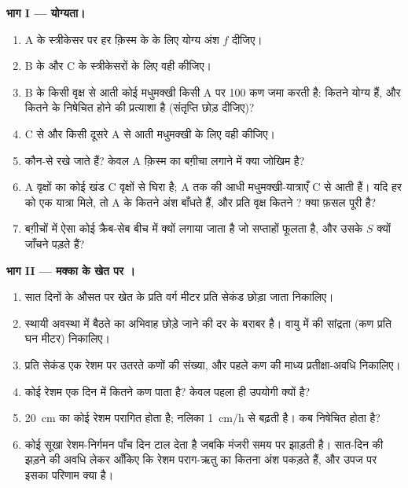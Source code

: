 \begin{problem}
\medskip
\noindent\textbf{भाग I --- योग्यता।}
\begin{enumerate}
  \item A के स्त्रीकेसर पर हर क़िस्म के  के लिए योग्य अंश
        $f$ दीजिए।
  \item B के और C के स्त्रीकेसरों के लिए वही कीजिए।
  \item B के किसी वृक्ष से आती कोई मधुमक्खी किसी A  पर 100
        कण जमा करती है: कितने योग्य हैं, और कितने  के
        निषेचित होने की प्रत्याशा है (संतृप्ति छोड़ दीजिए)?
  \item C से और किसी दूसरे A से आती मधुमक्खी के लिए वही कीजिए।
  \item कौन-से  रखे जाते हैं? केवल A क़िस्म का बग़ीचा लगाने में क्या
        जोखिम है?
  \item A वृक्षों का कोई खंड C वृक्षों से घिरा है; A तक की आधी
        मधुमक्खी-यात्राएँ C से आती हैं। यदि हर  को एक यात्रा मिले,
        तो A के कितने अंश   बाँधते हैं, और प्रति वृक्ष कितने ?
        क्या फ़सल पूरी है?
  \item बग़ीचों में ऐसा कोई क्रैब-सेब बीच में क्यों लगाया जाता है जो
        सप्ताहों फूलता है, और उसके $S$  क्यों जाँचने पड़ते हैं?
\end{enumerate}

\medskip
\noindent\textbf{भाग II --- मक्का के खेत पर ।}
\begin{enumerate}[resume]
  \item सात दिनों के औसत पर खेत के प्रति वर्ग मीटर प्रति सेकंड छोड़ा
        जाता  निकालिए।
  \item स्थायी अवस्था में बैठते  का अभिवाह छोड़े जाने की दर के
        बराबर है। वायु में  की सांद्रता (कण प्रति घन
        मीटर) निकालिए।
  \item प्रति सेकंड एक रेशम पर उतरते कणों की संख्या, और पहले कण की
        माध्य प्रतीक्षा-अवधि निकालिए।
  \item कोई रेशम एक दिन में कितने कण पाता है? केवल पहला ही उपयोगी
        क्यों है?
  \item \qty{20}{cm} का कोई रेशम परागित होता है; नलिका
        \qty{1}{cm/h} से बढ़ती है।  कब निषेचित होता है?
  \item कोई सूखा रेशम-निर्गमन पाँच दिन टाल देता है जबकि मंजरी
        समय पर झाड़ती है। सात-दिन की झड़ने की अवधि लेकर आँकिए कि रेशम
        पराग-ऋतु का कितना अंश पकड़ते हैं, और उपज पर इसका परिणाम क्या है।
\end{enumerate}


\end{problem}
